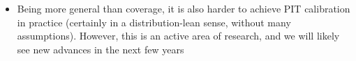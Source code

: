 \documentclass{article}
\begin{document}
\begin{itemize}
\item Being more general than coverage, it is also harder to achieve PIT
  calibration in practice (certainly in a distribution-lean sense, without many
  assumptions). However, this is an active area of research, and we will likely
  see new advances in the next few years
\end{itemize}



\end{document}
